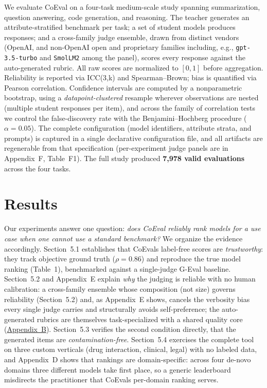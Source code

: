 We evaluate CoEval on a four-task medium-scale study spanning summarization, question answering, code generation, and
reasoning. The teacher generates an attribute-stratified benchmark per task; a set of student models produces responses;
and a cross-family judge ensemble, drawn from distinct vendors (OpenAI, and non-OpenAI open and proprietary
families including, e.g., \texttt{gpt-3.5-turbo} and \texttt{SmolLM2} among the panel), scores every
response against the auto-generated rubric. All raw scores are normalized to \([0,1]\) before aggregation. Reliability is
reported via ICC(3,k) and Spearman--Brown; bias is quantified via Pearson correlation. Confidence intervals are
computed by a nonparametric bootstrap, using a \emph{datapoint-clustered} resample wherever observations are nested
(multiple student responses per item), and across the family of correlation tests we control the false-discovery rate
with the Benjamini--Hochberg procedure (\(\alpha = 0.05\)). The complete configuration (model identifiers,
attribute strata, and prompts) is captured in a single declarative configuration file, and all artifacts are regenerable
from that specification (per-experiment judge panels are in Appendix~F, Table~F1). The full study produced \textbf{7,978 valid evaluations} across the four tasks.

\section{Results}\label{results}

Our experiments answer one question: \emph{does CoEval reliably rank models for a use case when one cannot use a
standard benchmark?} We organize the evidence accordingly. Section~5.1 establishes that CoEval\textquotesingle s label-free
scores are \emph{trustworthy}: they track objective ground truth (\(\rho = 0.86\)) and reproduce the true model
ranking (Table~1), benchmarked against a single-judge G-Eval baseline. Section~5.2 and Appendix~E explain
\emph{why} the judging is reliable with no human calibration: a cross-family ensemble whose composition (not size)
governs reliability (Section~5.2) and, as Appendix~E shows, cancels the verbosity bias every single judge
carries and structurally avoids self-preference; the auto-generated rubrics are themselves task-specialized with a shared quality core
(\hyperref[appB]{Appendix~B}). Section~5.3 verifies the second condition
directly, that the generated items are \emph{contamination-free}. Section~5.4 exercises the complete tool on three custom verticals (drug interaction, clinical, legal) with no labeled data, and Appendix~D shows that rankings are domain-specific: across four de-novo domains three different models take first place, so a generic leaderboard misdirects the practitioner that CoEval\textquotesingle s per-domain ranking serves.

